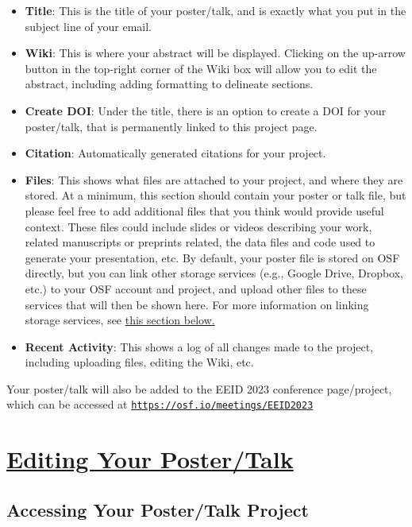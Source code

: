 \documentclass{scrartcl}
\begin{document}
\begin{itemize}
    \item \textbf{Title}: This is the title of your poster/talk, and is exactly what you put in the subject line of your email.
    \item \textbf{Wiki}: This is where your abstract will be displayed.
    Clicking on the up-arrow button in the top-right corner of the Wiki box will allow you to edit the abstract, including adding formatting to delineate sections.
    \item \textbf{Create DOI}: Under the title, there is an option to create a DOI for your poster/talk, that is permanently linked to this project page.
    \item \textbf{Citation}: Automatically generated citations for your project.
    \item \textbf{Files}: This shows what files are attached to your project, and where they are stored.
    At a minimum, this section should contain your poster or talk file, but please feel free to add additional files that you think would provide useful context.
    These files could include slides or videos describing your work, related manuscripts or preprints related, the data files and code used to generate your presentation, etc.
    By default, your poster file is stored on OSF directly, but you can link other storage services (e.g., Google Drive, Dropbox, etc.) to your OSF account and project, and upload other files to these services that will then be shown here.
    For more information on linking storage services, see \hyperref[sec:linking-services]{this section below.}
    \item \textbf{Recent Activity}: This shows a log of all changes made to the project, including uploading files, editing the Wiki, etc.
\end{itemize}

Your poster/talk will also be added to the EEID 2023 conference page/project, which can be accessed at \href{https://osf.io/meetings/EEID2023}{\texttt{https://osf.io/meetings/EEID2023}}

\section{\underline{Editing Your Poster/Talk}}

\subsection{Accessing Your Poster/Talk Project}
\end{document}

